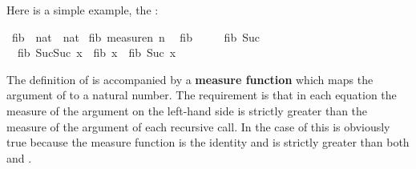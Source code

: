 %
\begin{isabellebody}%
\def\isabellecontext{examples}%
%
\isadelimtheory
%
\endisadelimtheory
%
\isatagtheory
%
\endisatagtheory
{\isafoldtheory}%
%
\isadelimtheory
%
\endisadelimtheory
%
\begin{isamarkuptext}%
Here is a simple example, the :%
\end{isamarkuptext}%
\isamarkuptrue%
\isamarkupfalse%
\ fib\ {\isacharcolon}{\isacharcolon}\ {\isachardoublequoteopen}nat\ {\isasymRightarrow}\ nat{\isachardoublequoteclose}\isanewline
{}\isamarkupfalse%
\ fib\ {\isachardoublequoteopen}measure{\isacharparenleft}{\isasymlambda}n{\isachardot}\ n{\isacharparenright}{\isachardoublequoteclose}\isanewline
\ \ {\isachardoublequoteopen}fib\ {}\ {\isacharequal}\ {}{\isachardoublequoteclose}\isanewline
\ \ {\isachardoublequoteopen}fib\ {\isacharparenleft}Suc\ {}{\isacharparenright}\ {\isacharequal}\ {}{\isachardoublequoteclose}\isanewline
\ \ {\isachardoublequoteopen}fib\ {\isacharparenleft}Suc{\isacharparenleft}Suc\ x{\isacharparenright}{\isacharparenright}\ {\isacharequal}\ fib\ x\ {\isacharplus}\ fib\ {\isacharparenleft}Suc\ x{\isacharparenright}{\isachardoublequoteclose}%
\begin{isamarkuptext}%
\noindent
{}%
The definition of  is accompanied by a \textbf{measure function}
 which maps the argument of  to a
natural number. The requirement is that in each equation the measure of the
argument on the left-hand side is strictly greater than the measure of the
argument of each recursive call. In the case of  this is
obviously true because the measure function is the identity and
 is strictly greater than both  and
.


\end{isamarkuptext}
\end{isabellebody}
